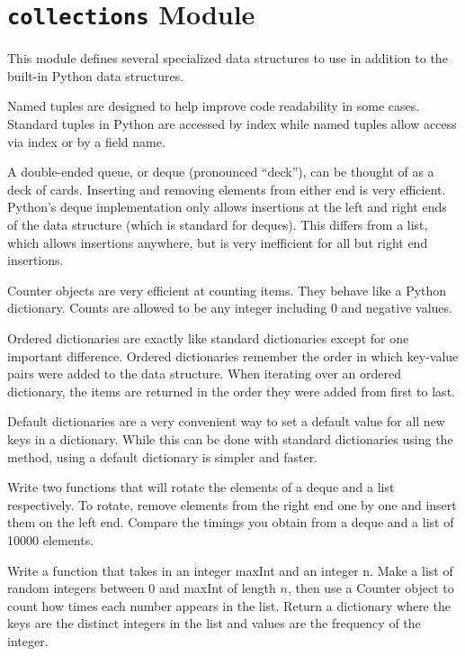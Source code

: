 \section*{\texttt{collections} Module}
This module defines several specialized data structures to use in addition to the built-in Python data structures.

Named tuples are designed to help improve code readability in some cases.
Standard tuples in Python are accessed by index while named tuples allow access via index or by a field name.

A double-ended queue, or deque (pronounced ``deck''), can be thought of as a deck of cards.
Inserting and removing elements from either end is very efficient.
Python's deque implementation only allows insertions at the left and right ends of the data structure (which is standard for deques).
This differs from a list, which allows insertions anywhere, but is very inefficient for all but right end insertions.
 
Counter objects are very efficient at counting items.  They behave like a Python dictionary.  Counts are allowed to be any integer including 0 and negative values.
 
Ordered dictionaries are exactly like standard dictionaries except for one important difference.
Ordered dictionaries remember the order in which key-value pairs were added to the data structure.
When iterating over an ordered dictionary, the items are returned in the order they were added from first to last.

Default dictionaries are a very convenient way to set a default value for all new keys in a dictionary.
While this can be done with standard dictionaries using the  method, using a default dictionary is simpler and faster.

\begin{problem}
Write two functions that will rotate the elements of a deque and a list respectively.
To rotate, remove elements from the right end one by one and insert them on the left end.
Compare the timings you obtain from a deque and a list of 10000 elements.
\end{problem}

\begin{problem}
Write a function that takes in an integer maxInt and an integer n.
Make a list of random integers between 0 and maxInt of length $n$, then use a Counter object to count how times each number appears in the list.
Return a dictionary where the keys are the distinct integers in the list and values are the frequency of the integer.
\end{problem}

